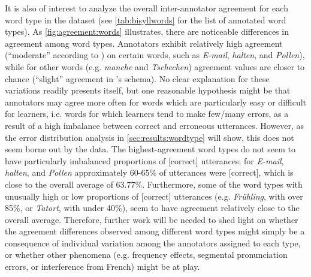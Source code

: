 		It is also of interest to analyze the overall inter-annotator agreement for each word type in the dataset (see \cref{tab:bisyllwords} for the list of annotated word types). 
		As \cref{fig:agreement:words} illustrates, there are noticeable differences in agreement among word types. Annotators exhibit relatively high agreement (``moderate'' according to \cite{Landis1977}) on certain words, such as \textit{E-mail}, \textit{halten}, and \textit{Pollen}), while for other words (e.g. \textit{manche} and \textit{Tschechen}) agreement values are closer to chance (``slight'' agreement in \citeauthor{Landis1977}'s schema). 
		No clear explanation for these variations readily presents itself, but one reasonable hypothesis might be that annotators may agree more often for words which are particularly easy or difficult for learners, i.e. words for which learners tend to make few/many errors, as a result of a high imbalance between correct and erroneous utterances. However, as the error distribution analysis in \cref{sec:results:wordtype} will show, this does not seem borne out by the data. The highest-agreement word types do not seem to have particularly imbalanced proportions of [correct] utterances; for \textit{E-mail}, \textit{halten}, and \textit{Pollen} approximately 60-65\% of utterances were [correct], which is close to the overall average of 63.77\%. Furthermore, some of the word types with unusually high or low proportions of [correct] utterances (e.g. \textit{Frühling}, with over 85\%, or \textit{Tatort}, with under 40\%), seem to have agreement relatively close to the overall average. Therefore, further work will be needed to shed light on whether the agreement differences observed among different word types might simply be a consequence of individual variation among the annotators assigned to each type, or whether other phenomena (e.g. frequency effects, segmental pronunciation errors, or interference from French) might be at play.
		
